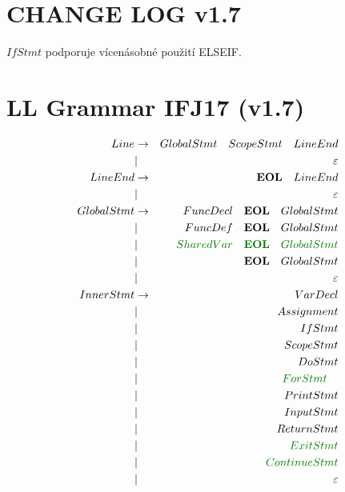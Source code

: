 \documentclass[a4paper,11pt,landscape,leqno]{article}
\begin{document}
\section{CHANGE LOG v1.7}
$IfStmt$ podporuje vícenásobné použití ELSEIF.
\section{LL Grammar IFJ17 (v1.7)}
\begin{eqnarray}
Line		&	\rightarrow		& GlobalStmt\quad ScopeStmt\quad  LineEnd	 \\
			&		|			& \varepsilon		  \\
LineEnd		& \rightarrow		& \textbf{EOL}\quad LineEnd\\
			&		|			& \varepsilon		  \\
GlobalStmt	&	\rightarrow		&  FuncDecl\quad \textbf{EOL}\quad GlobalStmt	 \\
			&		|			& FuncDef\quad \textbf{EOL}\quad GlobalStmt    \\
			&		|			& \textcolor{green1}{SharedVar\quad \textbf{EOL}\quad GlobalStmt}	 \\
			&		|			& \textbf{EOL}\quad GlobalStmt\\
			&		|			& \varepsilon \\
InnerStmt	&	\rightarrow		& VarDecl  \\
			&		|			& Assignment	\\
			&		|			& IfStmt	\\
			&		|			& ScopeStmt   \\
			&		|			& DoStmt  \\
			&		|			& \textcolor{green1}{ForStmt}\quad	\\
			&		|			& PrintStmt \\
			&		|			& InputStmt  \\
			&		|			& ReturnStmt  \\
			&		|			& \textcolor{green1}{ExitStmt}	\\
			&		|			& \textcolor{green1}{ContinueStmt}	\\
			&		|			& \varepsilon \\

\end{eqnarray}
\end{document}
